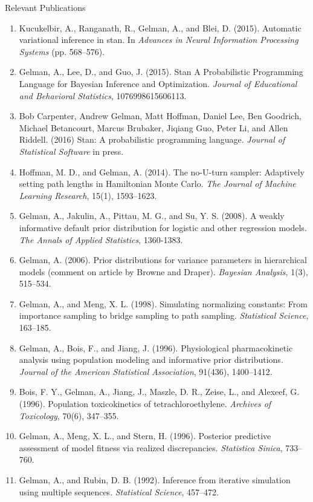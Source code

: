 \documentclass[11pt]{nih2016}
\begin{document}
\noindent
{\sc Relevant Publications}
\vspace*{-3pt}
\begin{enumerate}
\item Kucukelbir, A., Ranganath, R., Gelman, A., and Blei,
  D. (2015). Automatic variational inference in stan. In {\it Advances in
  Neural Information Processing Systems} (pp. 568--576).
\item Gelman, A., Lee, D., and Guo, J. (2015). Stan A Probabilistic
  Programming Language for Bayesian Inference and Optimization. {\it
    Journal of Educational and Behavioral Statistics},
  1076998615606113.
\item Bob Carpenter, Andrew Gelman, Matt Hoffman, Daniel Lee, Ben
  Goodrich, Michael Betancourt, Marcus Brubaker, Jiqiang Guo, Peter
  Li, and Allen Riddell. (2016) Stan: A probabilistic programming
  language.  {\it Journal of Statistical Software} in press.
\item Hoffman, M. D., and Gelman, A. (2014). The no-U-turn sampler:
  Adaptively setting path lengths in Hamiltonian Monte Carlo. {\it The
    Journal of Machine Learning Research}, 15(1), 1593--1623.
\item Gelman, A., Jakulin, A., Pittau, M. G., and Su, Y. S. (2008). A
  weakly informative default prior distribution for logistic and other
  regression models. {\it The Annals of Applied Statistics}, 1360-1383.
\item Gelman, A. (2006). Prior distributions for variance parameters
  in hierarchical models (comment on article by Browne and
  Draper). {\it Bayesian Analysis}, 1(3), 515--534.
\item Gelman, A., and Meng, X. L. (1998). Simulating normalizing
  constants: From importance sampling to bridge sampling to path
  sampling. {\it Statistical Science}, 163--185.
\item Gelman, A., Bois, F., and Jiang, J. (1996). Physiological
  pharmacokinetic analysis using population modeling and informative
  prior distributions. {\it Journal of the American Statistical
    Association}, 91(436), 1400--1412.
\item Bois, F. Y., Gelman, A., Jiang, J., Maszle, D. R., Zeise, L.,
  and Alexeef, G. (1996). Population toxicokinetics of
  tetrachloroethylene. {\it Archives of Toxicology}, 70(6), 347--355.
\item Gelman, A., Meng, X. L., and Stern, H. (1996). Posterior predictive
assessment of model fitness via realized discrepancies. {\it Statistica
Sinica}, 733--760.
\item Gelman, A., and Rubin, D. B. (1992). Inference from iterative
  simulation using multiple sequences. {\it Statistical Science},
  457--472.
\end{enumerate}
\end{document}

